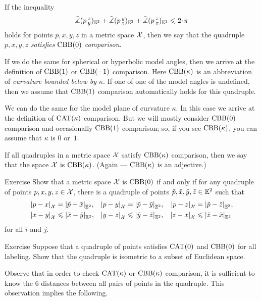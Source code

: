 If the inequality
\[\angk pxy_{\EE^2}+\angk pyz_{\EE^2}+\angk pzx_{\EE^2}\le2\cdot\pi\]
holds for points $p,x,y,z$ in a metric space $\mathcal{X}$,
then we say that 
the quadruple $p,x,y,z$ \emph{satisfies $\mathrm{CBB}(0)$ comparison}.\label{page:CBB-comparison}

If we do the same for spherical or hyperbolic model angles,
then we arrive at the definition of $\mathrm{CBB}(1)$ or $\mathrm{CBB}(-1)$ comparison.
Here $\mathrm{CBB}(\kappa)$ is an abbreviation of \emph{curvature bounded below by $\kappa$}.
If one of one of the model angles is undefined,
then we assume that $\mathrm{CBB}(1)$ comparison automatically holds for this quadruple.

We can do the same for the model plane of curvature $\kappa$.
In this case we arrive at the definition of $\mathrm{CAT}(\kappa)$ comparison.
But we will mostly consider  $\mathrm{CBB}(0)$ comparison and occasionally $\mathrm{CBB}(1)$ comparison;
so, if you see $\mathrm{CBB}(\kappa)$, you can assume that $\kappa$ is $0$ or~$1$.

If all quadruples in a metric space $\mathcal{X}$ satisfy $\mathrm{CBB}(\kappa)$ comparison, then we say that the space $\mathcal{X}$ is $\mathrm{CBB}(\kappa)$.
(Again --- $\mathrm{CBB}(\kappa)$ is an adjective.)

\begin{thm}{Exercise}\label{ex:(3+1)-expanding}
Show that a metric space $\mathcal{X}$ is $\mathrm{CBB}(0)$
if and only if for any quadruple of points $p,x,y,z\in \mathcal{X}$,
there is a quadruple of points $\tilde p,\tilde x,\tilde y,\tilde z\in\mathbb{E}^2$
such that 
\begin{align*}
\dist{p}{x}{\spc{X}}&=\dist{\tilde p}{\tilde x}{\EE^2},
&
\dist{p}{y}{\spc{X}}&=\dist{\tilde p}{\tilde y}{\EE^2},
&
\dist{p}{z}{\spc{X}}&=\dist{\tilde p}{\tilde z}{\EE^2},
\\
\dist{x}{y}{\spc{X}}&\le\dist{\tilde x}{\tilde y}{\EE^2},
&
\dist{y}{z}{\spc{X}}&\le\dist{\tilde y}{\tilde z}{\EE^2},
&
\dist{z}{x}{\spc{X}}&\le\dist{\tilde z}{\tilde x}{\EE^2}
\end{align*}
for all $i$ and $j$.
\end{thm}

\begin{thm}{Exercise}\label{ex:CAT+CBB}
Suppose that a quadruple of points satisfies $\mathrm{CAT}(0)$ and $\mathrm{CBB}(0)$ for all labeling.
Show that the quadruple is isometric to a subset of Euclidean space.
\end{thm}

Observe that in order to check $\mathrm{CAT}(\kappa)$ or $\mathrm{CBB}(\kappa)$ comparison, it is sufficient to know the 6 distances between all pairs of points in the quadruple.
This observation implies the following.

